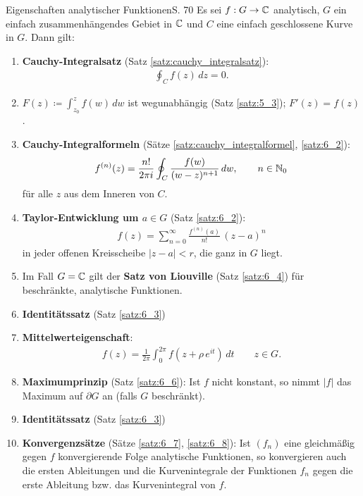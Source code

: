 \begin{bemerkung}{Eigenschaften analytischer Funktionen}{S. 70}
  Es sei $f: G \to \mathbb{C}$ analytisch, $G$ ein einfach zusammenhängendes Gebiet in $\mathbb{C}$ und $C$ eine einfach geschlossene Kurve in $G$.
  Dann gilt:
  \begin{enumerate}
    \item \textbf{Cauchy-Integralsatz} (Satz \ref{satz:cauchy_integralsatz}):
      \begin{align}
        \oint_C f(z) \, dz = 0 .
      \end{align}
    \item $\displaystyle F(z) \coloneqq \int_{z_0}^z f(w) \, dw$ ist wegunabhängig (Satz \ref{satz:5_3}); $F'(z) = f(z)$.
    \item \textbf{Cauchy-Integralformeln} (Sätze \ref{satz:cauchy_integralformel}, \ref{satz:6_2}):
      \begin{align}
        f^{(n)}(z) =  \frac{n!}{2 \pi i} \oint_{C} \frac{f(w)}{(w-z)^{n+1}} \, dw, \qquad n \in \mathbb{N}_0
      \end{align}
      für alle $z$ aus dem Inneren von $C$.
    \item \textbf{Taylor-Entwicklung um $a \in G$} (Satz \ref{satz:6_2}):
      \begin{align}
        f(z) = \sum_{n=0}^\infty \frac{f^{(n)}(a)}{n!} \, (z - a)^n %
      \end{align}
      in jeder offenen Kreisscheibe $|z-a| < r$, die ganz in $G$ liegt.
    \item Im Fall $G = \mathbb{C}$ gilt der \textbf{Satz von Liouville} (Satz \ref{satz:6_4}) für beschränkte, analytische Funktionen.
    \item \textbf{Identitätssatz} (Satz \ref{satz:6_3})
    \item \textbf{Mittelwerteigenschaft}:
      \begin{align}
        f(z) = \frac{1}{2 \pi} \int_0^{2 \pi} f \left( z + \rho \, e^{it} \right) \, dt \qquad z \in G .
      \end{align}
    \item \textbf{Maximumprinzip} (Satz \ref{satz:6_6}): Ist $f$ nicht konstant, so nimmt $|f|$ das Maximum auf $\partial G$ an (falls $G$ beschränkt).
    \item \textbf{Identitätssatz} (Satz \ref{satz:6_3})
    \item \textbf{Konvergenzsätze} (Sätze \ref{satz:6_7}, \ref{satz:6_8}): Ist $(f_n)$ eine gleichmäßig gegen $f$ konvergierende Folge analytische Funktionen, so konvergieren auch die ersten Ableitungen und die Kurvenintegrale der Funktionen $f_n$ gegen die erste Ableitung bzw. das Kurvenintegral von $f$.
  \end{enumerate}
\end{bemerkung}
